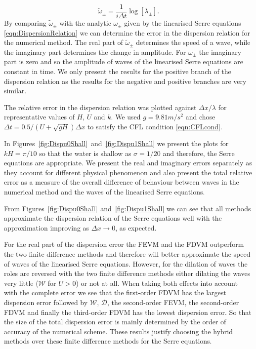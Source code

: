 \begin{equation}
\widetilde{\omega}_\pm = \frac{1}{i \Delta t} \log\left[ \lambda_\pm\right].
\end{equation}
By comparing $\widetilde{\omega}_\pm$ with the analytic $\omega_\pm$ given by the linearised Serre equations \eqref{eqn:DispersionRelation} we can determine the error in the dispersion relation for the numerical method. The real part of $\widetilde{\omega}_\pm$ determines the speed of a wave, while the imaginary part determines the change in amplitude. For $\omega_\pm$ the imaginary part is zero and so the amplitude of waves of the linearised Serre equations are constant in time. We only present the results for the positive branch of the dispersion relation as the results for the negative and positive branches are very similar. 

The relative error in the dispersion relation was plotted against $\Delta x / \lambda$ for representative values of $H$, $U$ and $k$.  We used $g = 9.81m/s^2$ and chose $\Delta t = 0.5 / \left(U + \sqrt{gH}\right) \Delta x$ to satisfy the CFL condition \eqref{eqn:CFLcond}.

In Figures~\ref{fig:Dispu0Shall}~and~\ref{fig:Dispu1Shall} we present the plots for $kH = \pi / 10$ so that the water is shallow as $\sigma = 1 / 20$ and therefore, the Serre equations are appropriate. We present the real and imaginary errors separately as they account for different physical phenomenon and also present the total relative error as a measure of the overall difference of behaviour between waves in the numerical method and the waves of the linearised Serre equations.

From Figures~\ref{fig:Dispu0Shall}~and~\ref{fig:Dispu1Shall} we can see that all methods approximate the dispersion relation of the Serre equations well with the approximation improving as $\Delta x \rightarrow 0$, as expected.

For the real part of the dispersion error the FEVM and the FDVM outperform the two finite difference methods and therefore will better approximate the speed of waves of the linearised Serre equations.  However, for the dilation of waves the roles are reversed with the two finite difference methods either dilating the waves very little ($\mathcal{W}$ for $U>0$) or not at all. When taking both effects into account with the complete error we see that the first-order FDVM has the largest dispersion error followed by $\mathcal{W}$, $\mathcal{D}$, the second-order FEVM, the second-order FDVM and finally the third-order FDVM has the lowest dispersion error. So that the size of the total dispersion error is mainly determined by the order of accuracy of the numerical scheme. These results justify choosing the hybrid methods over these finite difference methods for the Serre equations. 

